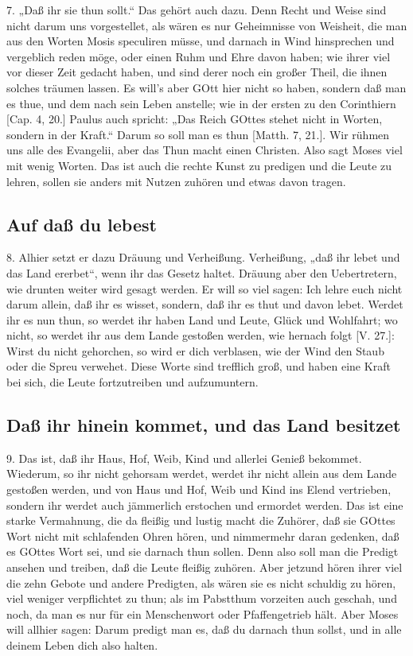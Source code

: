 7. „Daß ihr sie thun sollt.“ Das gehört auch dazu. Denn Recht und Weise sind nicht darum uns vorgestellet, als wären es nur Geheimnisse von Weisheit, die man aus den Worten Mosis speculiren müsse, und darnach in Wind hinsprechen und vergeblich reden möge, oder einen Ruhm und Ehre davon haben; wie ihrer viel vor dieser Zeit gedacht haben, und sind derer noch ein großer Theil, die ihnen solches träumen lassen. Es will’s aber GOtt hier nicht so haben, sondern daß man es thue, und dem nach sein Leben anstelle; wie in der ersten zu den Corinthiern [Cap. 4, 20.] Paulus auch spricht: „Das Reich GOttes stehet nicht in Worten, sondern in der Kraft.“ Darum so soll man es thun [Matth. 7, 21.]. Wir rühmen uns alle des Evangelii, aber das Thun macht einen Christen. Also sagt Moses viel mit wenig Worten. Das ist auch die rechte Kunst zu predigen und die Leute zu lehren, sollen sie anders mit Nutzen zuhören und etwas davon tragen.

\subsection{Auf daß du lebest}

8. Alhier setzt er dazu Dräuung und Verheißung. Verheißung, „daß ihr lebet und das Land ererbet“, wenn ihr das Gesetz haltet. Dräuung aber den Uebertretern, wie drunten weiter wird gesagt werden. Er will so viel sagen: Ich lehre euch nicht darum allein, daß ihr es wisset, sondern, daß ihr es thut und davon lebet. Werdet ihr es nun thun, so werdet ihr haben Land und Leute, Glück und Wohlfahrt; wo nicht, so werdet ihr aus dem Lande gestoßen werden, wie hernach folgt [V. 27.]: Wirst du nicht gehorchen, so wird er dich verblasen, wie
der Wind den Staub oder die Spreu verwehet. Diese Worte sind trefflich groß, und haben eine Kraft bei sich, die Leute fortzutreiben und aufzumuntern.

\subsection{Daß ihr hinein kommet, und das Land besitzet}

9. Das ist, daß ihr Haus, Hof, Weib, Kind und allerlei Genieß bekommet. Wiederum, so ihr nicht gehorsam werdet, werdet ihr nicht allein aus dem Lande gestoßen werden, und von Haus und Hof, Weib und Kind ins Elend vertrieben, sondern ihr werdet auch jämmerlich erstochen und ermordet werden. Das ist eine starke Vermahnung, die da fleißig und lustig macht die Zuhörer, daß sie GOttes Wort nicht mit schlafenden Ohren hören, und nimmermehr daran gedenken, daß es GOttes Wort sei, und sie darnach thun sollen. Denn also soll man die Predigt ansehen und treiben, daß die Leute fleißig zuhören. Aber jetzund hören ihrer viel die zehn Gebote und andere Predigten, als wären sie es nicht schuldig zu hören, viel weniger verpflichtet zu thun; als im Pabstthum vorzeiten auch geschah, und noch, da man es nur für ein Menschenwort oder Pfaffengetrieb hält. Aber Moses will allhier sagen: Darum predigt man es, daß du darnach thun sollst, und in alle deinem Leben dich also halten.

